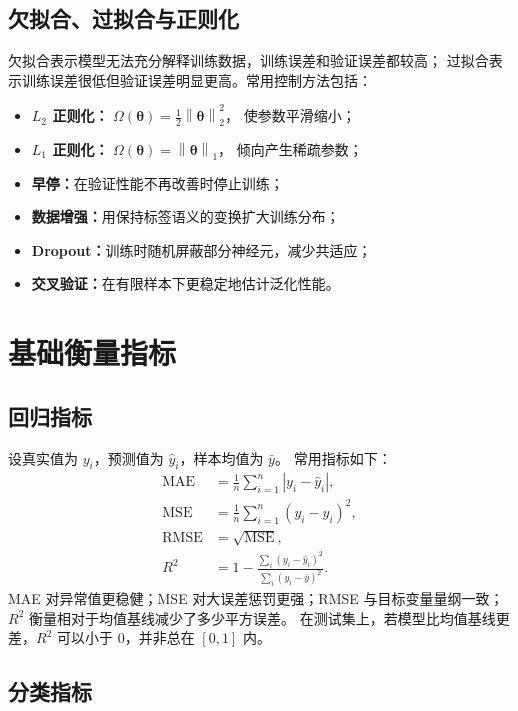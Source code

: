 \documentclass[UTF8,zihao=-4,a4paper,fontset=windows]{ctexart}
\newcommand{\norm}[1]{\left\lVert #1\right\rVert}
\newcommand{\abs}[1]{\left|#1\right|}
\begin{document}
\subsection{欠拟合、过拟合与正则化}

欠拟合表示模型无法充分解释训练数据，训练误差和验证误差都较高；
过拟合表示训练误差很低但验证误差明显更高。常用控制方法包括：
\begin{itemize}
  \item \textbf{$L_2$ 正则化：}
  $\Omega(\bm{\theta})=\frac{1}{2}\norm{\bm{\theta}}_2^2$，
  使参数平滑缩小；
  \item \textbf{$L_1$ 正则化：}
  $\Omega(\bm{\theta})=\norm{\bm{\theta}}_1$，
  倾向产生稀疏参数；
  \item \textbf{早停：}在验证性能不再改善时停止训练；
  \item \textbf{数据增强：}用保持标签语义的变换扩大训练分布；
  \item \textbf{Dropout：}训练时随机屏蔽部分神经元，减少共适应；
  \item \textbf{交叉验证：}在有限样本下更稳定地估计泛化性能。
\end{itemize}

\section{基础衡量指标}

\subsection{回归指标}

设真实值为 $y_i$，预测值为 $\hat y_i$，样本均值为 $\bar y$。
常用指标如下：
\begin{align}
  \mathrm{MAE}
  &=\frac{1}{n}\sum_{i=1}^{n}\abs{y_i-\hat y_i},\\
  \mathrm{MSE}
  &=\frac{1}{n}\sum_{i=1}^{n}(y_i-\hat y_i)^2,\\
  \mathrm{RMSE}
  &=\sqrt{\mathrm{MSE}},\\
  R^2
  &=1-\frac{\sum_i(y_i-\hat y_i)^2}
  {\sum_i(y_i-\bar y)^2}.
\end{align}
MAE 对异常值更稳健；MSE 对大误差惩罚更强；RMSE 与目标变量量纲一致；
$R^2$ 衡量相对于均值基线减少了多少平方误差。
在测试集上，若模型比均值基线更差，$R^2$ 可以小于 $0$，并非总在 $[0,1]$ 内。

\subsection{分类指标}
\end{document}
